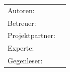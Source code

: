 \begin{titlepage}
\begin{center}
	\vspace{1ex}
	\LARGE 
	\place
	
	\vspace{5ex}
	\begin{framed}
		\timeperiod
	\end{framed}
\end{center}

\vspace{9ex}
\begin{tabular}{ll} %
	Autoren:        & \authors    \\
	Betreuer:        & \advisor    \\
	Projektpartner:		& \partner \\
	Experte:			& \expert \\
	Gegenleser:        & \revisor     \\
\end{tabular}

\end{titlepage}

\restoregeometry %
